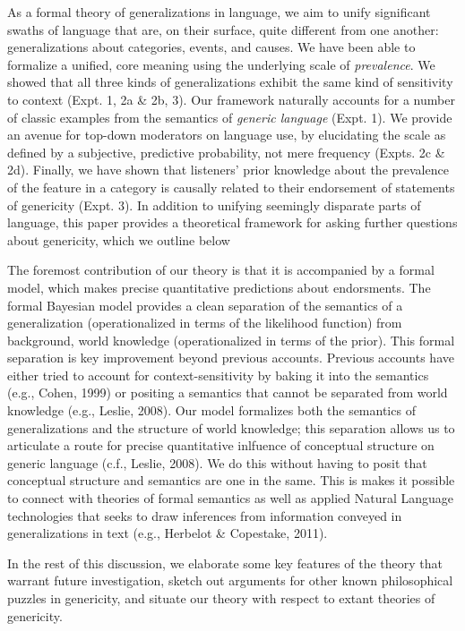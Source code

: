 \documentclass[english,floatsintext,man]{apa6}
\theoremstyle{definition}
\theoremstyle{definition}
\theoremstyle{definition}
\theoremstyle{remark}
\begin{document}
As a formal theory of generalizations in language, we aim to unify
significant swaths of language that are, on their surface, quite
different from one another: generalizations about categories, events,
and causes. We have been able to formalize a unified, core meaning using
the underlying scale of \emph{prevalence}. We showed that all three
kinds of generalizations exhibit the same kind of sensitivity to context
(Expt. 1, 2a \& 2b, 3). Our framework naturally accounts for a number of
classic examples from the semantics of \emph{generic language} (Expt.
1). We provide an avenue for top-down moderators on language use, by
elucidating the scale as defined by a subjective, predictive
probability, not mere frequency (Expts. 2c \& 2d). Finally, we have
shown that listeners' prior knowledge about the prevalence of the
feature in a category is causally related to their endorsement of
statements of genericity (Expt. 3). In addition to unifying seemingly
disparate parts of language, this paper provides a theoretical framework
for asking further questions about genericity, which we outline below

The foremost contribution of our theory is that it is accompanied by a
formal model, which makes precise quantitative predictions about
endorsments. The formal Bayesian model provides a clean separation of
the semantics of a generalization (operationalized in terms of the
likelihood function) from background, world knowledge (operationalized
in terms of the prior). This formal separation is key improvement beyond
previous accounts. Previous accounts have either tried to account for
context-sensitivity by baking it into the semantics (e.g., Cohen, 1999)
or positing a semantics that cannot be separated from world knowledge
(e.g., Leslie, 2008). Our model formalizes both the semantics of
generalizations and the structure of world knowledge; this separation
allows us to articulate a route for precise quantitative inlfuence of
conceptual structure on generic language (c.f., Leslie, 2008). We do
this without having to posit that conceptual structure and semantics are
one in the same. This is makes it possible to connect with theories of
formal semantics as well as applied Natural Language technologies that
seeks to draw inferences from information conveyed in generalizations in
text (e.g., Herbelot \& Copestake, 2011).

In the rest of this discussion, we elaborate some key features of the
theory that warrant future investigation, sketch out arguments for other
known philosophical puzzles in genericity, and situate our theory with
respect to extant theories of genericity.
\end{document}
